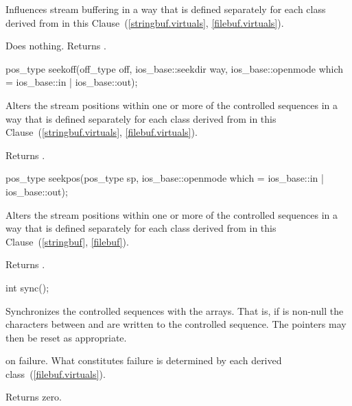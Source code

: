 \begin{itemdescr}
\pnum
\effects
Influences stream buffering in a way that is defined separately for each class
derived from
in this Clause~(\ref{stringbuf.virtuals},
\ref{filebuf.virtuals}).

\pnum
{}
Does nothing.
Returns
.
\end{itemdescr}

%
\begin{itemdecl}
pos_type seekoff(off_type off, ios_base::seekdir way,
                 ios_base::openmode which
                  = ios_base::in | ios_base::out);
\end{itemdecl}

\begin{itemdescr}
\pnum
\effects
Alters the stream positions within one or more of
the controlled sequences in a way that is defined separately for each class
derived from
in this Clause~(\ref{stringbuf.virtuals},
\ref{filebuf.virtuals}).

\pnum
{}
Returns
.
\end{itemdescr}

%
\begin{itemdecl}
pos_type seekpos(pos_type sp,
                 ios_base::openmode which
                  = ios_base::in | ios_base::out);
\end{itemdecl}

\begin{itemdescr}
\pnum
\effects
Alters the stream positions within one or more of
the controlled sequences in a way that is defined separately for each class
derived from
in this Clause~(\ref{stringbuf},
\ref{filebuf}).

\pnum
{}
Returns
.
\end{itemdescr}

%
\begin{itemdecl}
int sync();
\end{itemdecl}

\begin{itemdescr}
\pnum
\effects
Synchronizes the controlled sequences with the arrays.
That is, if
is non-null the characters between
and
are written to the controlled sequence.
The pointers may then be reset as appropriate.

\pnum
{} on failure.
What constitutes failure is determined by each derived class~(\ref{filebuf.virtuals}).

\pnum
{}
Returns zero.
\end{itemdescr}

